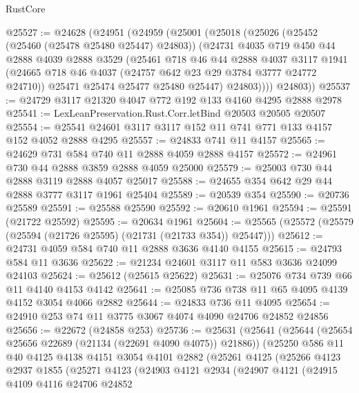 \begin{lexlean}{RustCore}
\begin{coremodule}
@25527 := @24628
    (@24951
      (@24959
        (@25001
          (@25018
            (@25026
              (@25452 (@25460 (@25478 @25480 @25447) @24803))
              (@24731
                @4035
                @719
                @450
                @44
                @2888
                @4039
                @2888
                @3529
                (@25461
                  @718
                  @46
                  @44
                  @2888
                  @4037
                  @3117
                  @1941
                  (@24665 @718 @46 @4037 (@24757 @642 @23 @29 @3784 @3777 @24772 @24710))
                  @25471
                  @25474
                  @25477
                  @25480
                  @25447)
                @24803))))
        @24803))
@25537 := @24729 @3117 @21320 @4047 @772 @192 @133 @4160 @4295 @2888 @2978
@25541 := LexLeanPreservation.Rust.Corr.letBind @20503 @20505 @20507
@25554 := @25541 @24601 @3117 @3117 @152 @11 @741 @771 @133 @4157 @152 @4052 @2888 @4295
@25557 := @24833 @741 @11 @4157
@25565 := @24629 @731 @584 @740 @11 @2888 @4059 @2888 @4157
@25572 := @24961 @730 @44 @2888 @3859 @2888 @4059 @25000
@25579 := @25003 @730 @44 @2888 @3119 @2888 @4057 @25017
@25588 := @24655 @354 @642 @29 @44 @2888 @3777 @3117 @1961 @25404
@25589 := @20539 @354
@25590 := @20736 @25589
@25591 := @25588 @25590
@25592 := @20610 @1961
@25594 := @25591 (@21722 @25592)
@25595 := @20634 @1961
@25604 := @25565 (@25572 (@25579 (@25594 (@21726 @25595) (@21731 (@21733 @354)) @25447)))
@25612 := @24731 @4059 @584 @740 @11 @2888 @3636 @4140 @4155
@25615 := @24793 @584 @11 @3636
@25622 := @21234 @24601 @3117 @11 @583 @3636 @24099 @24103
@25624 := @25612 (@25615 @25622)
@25631 := @25076 @734 @739 @66 @11 @4140 @4153 @4142
@25641 := @25085 @736 @738 @11 @65 @4095 @4139 @4152 @3054 @4066 @2882
@25644 := @24833 @736 @11 @4095
@25654 := @24910 @253 @74 @11 @3775 @3067 @4074 @4090 @24706 @24852 @24856
@25656 := @22672 (@24858 @253)
@25736 := @25631
    (@25641
      (@25644 (@25654 @25656 @22689 (@21134 (@22691 @4090 @4075)) @21886))
      (@25250
        @586
        @11
        @40
        @4125
        @4138
        @4151
        @3054
        @4101
        @2882
        (@25261
          @4125
          (@25266
            @4123
            @2937
            @1855
            (@25271
              @4123
              (@24903
                @4121
                @2934
                (@24907
                  @4121
                  (@24915
                    @4109
                    @4116
                    @24706
                    @24852

\end{coremodule}
\end{lexlean}
